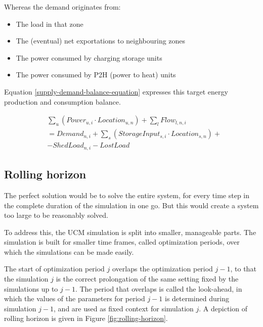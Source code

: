 Whereas the demand originates from:
\begin{itemize}
    \item The load in that zone
    \item The (eventual) net exportations to neighbouring zones
    \item The power consumed by charging storage units
    \item The power consumed by P2H (power to heat) units
\end{itemize}

Equation \ref{supply-demand-balance-equation} expresses this target energy production and consumption balance.

\begin{captionnable}[h]
    \begin{equation}
        \begin{split}
            &\sum_{u} (Power_{u,i} \cdot Location_{u,n}) + \sum_{l} Flow_{l,n,i} \\
            & = Demand_{n,i} + \sum_{s} (StorageInput_{s,i} \cdot Location_{s,n}) + \\
            & - ShedLoad_{n,i} - LostLoad 		
        \end{split}
        \label{supply-demand-balance-equation}
    \end{equation}
\end{captionnable}

\subsection{Rolling horizon}

The perfect solution would be to solve the entire system, for every time step in the complete duration of the simulation in one go. But this would create a system too large to be reasonably solved.

To address this, the UCM simulation is split into smaller, manageable parts. The simulation is built for smaller time frames, called optimization periods, over which the simulations can be made easily.

The start of optimization period $j$ overlaps the optimization period $j-1$, to that the simulation $j$ is the correct prolongation of the same setting fixed by the simulations up to $j-1$. The period that overlaps is called the look-ahead, in which the values of the parameters for period $j-1$ is determined during simulation $j-1$, and are used as fixed context for simulation $j$. A depiction of rolling horizon is given in Figure \ref{fig:rolling-horizon}.

